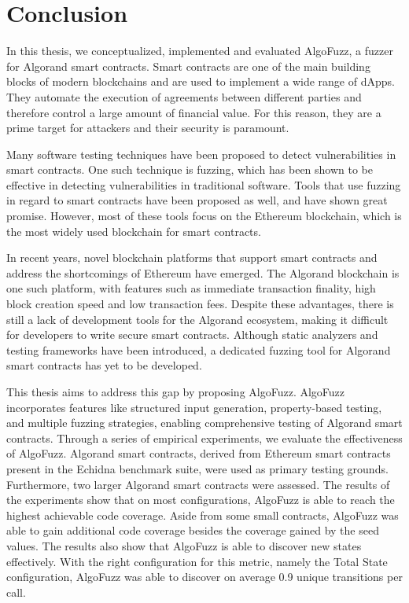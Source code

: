 
\chapter{Conclusion}\label{chapter:conclusion}
In this thesis, we conceptualized, implemented and evaluated AlgoFuzz, a fuzzer for Algorand smart contracts.
Smart contracts are one of the main building blocks of modern blockchains and are used to implement a wide range of \acp{dApp}.
They automate the execution of agreements between different parties and therefore control a large amount of financial value.
For this reason, they are a prime target for attackers and their security is paramount.

Many software testing techniques have been proposed to detect vulnerabilities in smart contracts.
One such technique is fuzzing, which has been shown to be effective in detecting vulnerabilities in traditional software.
Tools that use fuzzing in regard to smart contracts have been proposed as well, and have shown great promise.
However, most of these tools focus on the Ethereum blockchain, which is the most widely used blockchain for smart contracts.

In recent years, novel blockchain platforms that support smart contracts and address the shortcomings of Ethereum have emerged.
The Algorand blockchain is one such platform, with features such as immediate transaction finality, high block creation speed and low transaction fees.
Despite these advantages, there is still a lack of development tools for the Algorand ecosystem, making it difficult for developers to write secure smart contracts.
Although static analyzers and testing frameworks have been introduced, a dedicated fuzzing tool for Algorand smart contracts has yet to be developed.

This thesis aims to address this gap by proposing AlgoFuzz.
AlgoFuzz incorporates features like structured input generation, property-based testing, and multiple fuzzing strategies, enabling comprehensive testing of Algorand smart contracts.
Through a series of empirical experiments, we evaluate the effectiveness of AlgoFuzz.
Algorand smart contracts, derived from Ethereum smart contracts present in the Echidna benchmark suite, were used as primary testing grounds.
Furthermore, two larger Algorand smart contracts were assessed.
The results of the experiments show that on most configurations, AlgoFuzz is able to reach the highest achievable code coverage.
Aside from some small contracts, AlgoFuzz was able to gain additional code coverage besides the coverage gained by the seed values.
The results also show that AlgoFuzz is able to discover new states effectively.
With the right configuration for this metric, namely the Total State configuration, AlgoFuzz was able to discover on average 0.9 unique transitions per call.



